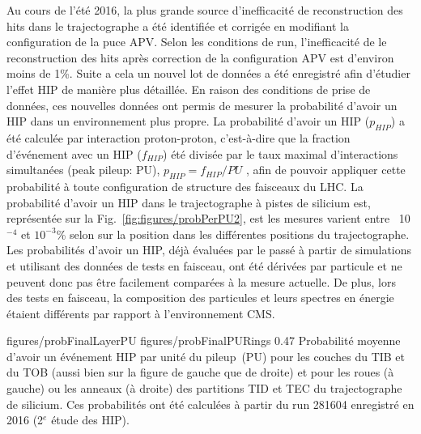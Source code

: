 Au cours de l'été 2016, la plus grande source d'inefficacité de reconstruction des hits dans le trajectographe a été identifiée et corrigée en modifiant la configuration de la puce APV. Selon les conditions de run, l'inefficacité de le reconstruction des hits après correction de la configuration APV est d'environ moins de 1\%. Suite a cela un nouvel lot de données a été enregistré afin d'étudier l'effet HIP de manière plus détaillée. En raison des conditions de prise de données, ces nouvelles données ont permis de mesurer la probabilité d'avoir un HIP dans un environnement plus propre. La probabilité d'avoir un HIP ($p_{HIP}$) a été calculée par interaction proton-proton, c'est-à-dire que la fraction d'événement avec un HIP ($f_{HIP}$) été divisée par le taux maximal d'interactions simultanées (peak pileup: PU), $p_{HIP} = f_{HIP}/PU$ , afin de pouvoir appliquer cette probabilité à toute configuration de structure des faisceaux du LHC. La probabilité d'avoir un HIP dans le trajectographe à pistes de silicium est, représentée sur la Fig.~\ref{fig:figures/probPerPU2}, est les mesures varient entre ~10$^{-4} $ et $ 10^{-3}$\% selon sur la position dans les différentes positions du trajectographe. Les probabilités d'avoir un HIP, déjà évaluées par le passé à partir de simulations et utilisant des données de tests en faisceau, ont été dérivées par particule et ne peuvent donc pas être facilement comparées à la mesure actuelle. De plus, lors des tests en faisceau, la composition des particules et leurs spectres en énergie étaient différents par rapport à l'environnement CMS.

                 {figures/probFinalLayerPU} %
                 {figures/probFinalPURings} %
                 {0.47}       %
                 { Probabilité moyenne d'avoir un événement HIP par unité du pileup~(PU) pour les couches du TIB et du TOB (aussi bien sur la figure  de gauche que de droite) et pour les roues (à gauche) ou les anneaux (à droite) des partitions TID et TEC du trajectographe de silicium. Ces probabilités ont été calculées à partir du run 281604 enregistré en 2016 (2$^e$ étude des HIP).}


